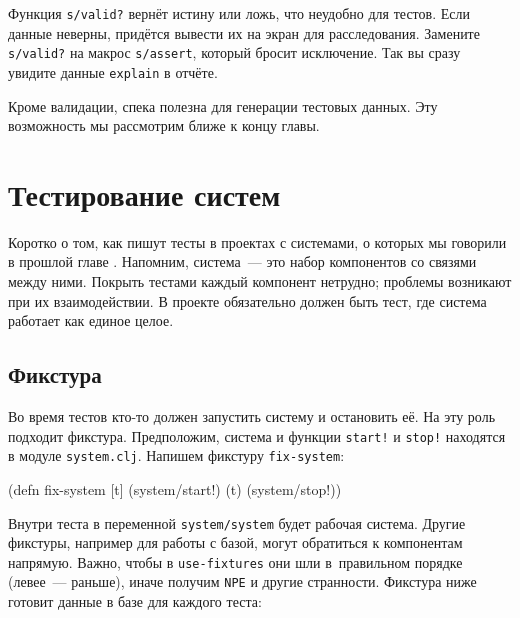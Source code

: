 \fi

Функция \verb|s/valid?| вернёт истину или ложь, что неудобно для тестов. Если
данные неверны, придётся вывести их на экран для расследования. Замените
\verb|s/valid?| на макрос \verb|s/assert|, который бросит исключение. Так
вы сразу увидите данные \verb|explain| в отчёте.


Кроме валидации, спека полезна для генерации тестовых данных. Эту возможность мы
рассмотрим ближе к концу главы.

\section{Тестирование систем}


Коротко о том, как пишут тесты в проектах с системами, о которых мы говорили в
прошлой главе . Напомним, система~--- это набор компонентов со
связями между ними. Покрыть тестами каждый компонент нетрудно; проблемы
возникают при их взаимодействии. В проекте обязательно должен быть тест, где
система работает как единое целое.

\subsection{Фикстура}


Во время тестов кто-то должен запустить систему и остановить её. На эту роль
подходит фикстура. Предположим, система и функции \verb|start!| и \verb|stop!|
находятся в модуле \verb|system.clj|. Напишем фикстуру \verb|fix-system|:

\begin{english}
  \begin{clojure}
(defn fix-system
  [t]
  (system/start!)
  (t)
  (system/stop!))
  \end{clojure}
\end{english}

Внутри теста в переменной \verb|system/system| будет рабочая система. Другие
фикстуры, например для работы с базой, могут обратиться к компонентам
напрямую. Важно, чтобы в \verb|use-fixtures| они шли в~правильном порядке
(левее~--- раньше), иначе получим \verb|NPE| и другие странности. Фикстура ниже
готовит данные в базе для каждого теста:


\ifnarrow

